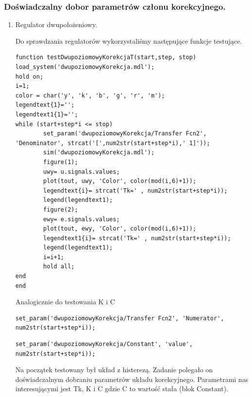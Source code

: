 \documentclass[a4paper,10pt]{article}
\begin{document}
\subsubsection{Doświadczalny dobor parametrów członu korekcyjnego.}\label{sec:zad2_2}
\begin{enumerate}
		\item Regulator dwupołożeniowy.
		
		Do sprawdzania regulatorów wykorzystaliśmy następujące funkcje testujące.
		
\begin{lstlisting}[caption=Funkcja testująca regulator dwupoziomowy z korekcją zmiana T.]
function testDwupoziomowyKorekcjaT(start,step, stop)
load_system('dwupoziomowyKorekcja.mdl');
hold on;
i=1;
color = char('y', 'k', 'b', 'g', 'r', 'm');
legendtext{1}='';
legendtext1{1}='';
while (start+step*i <= stop)
        set_param('dwupoziomowyKorekcja/Transfer Fcn2', 'Denominator', strcat('[',num2str(start+step*i),' 1]'));
        sim('dwupoziomowyKorekcja.mdl');
        figure(1);
        uwy= u.signals.values;    
        plot(tout, uwy, 'Color', color(mod(i,6)+1));        
        legendtext{i}= strcat('Tk=' , num2str(start+step*i));
        legend(legendtext1);
        figure(2);
        ewy= e.signals.values;    
        plot(tout, ewy, 'Color', color(mod(i,6)+1));        
        legendtext1{i}= strcat('Tk=' , num2str(start+step*i));
        legend(legendtext1);
        i=i+1;
        hold all;
end
end
\end{lstlisting}

Analogicznie do testowania K i C

\begin{lstlisting}[caption=set param dla K.]
set_param('dwupoziomowyKorekcja/Transfer Fcn2', 'Numerator', num2str(start+step*i));
\end{lstlisting}

\begin{lstlisting}[caption=set param dla C.]
set_param('dwupoziomowyKorekcja/Constant', 'value', num2str(start+step*i));
\end{lstlisting}

\newpage

Na początek testowany był układ z histerezą. Zadanie polegało on doświadczalnym dobraniu parametrów układu korekcyjnego.
Parametrami nas interesującymi jest Tk, K i C gdzie C to wartość stała (blok Constant).


\end{enumerate}
\end{document}
